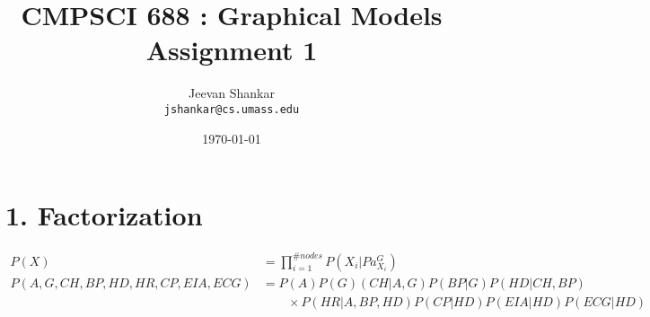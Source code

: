 \documentclass[a4paper,10pt]{report}
\title{CMPSCI 688 : Graphical Models \\ Assignment 1}
\author{\color{red}Jeevan Shankar \\ \texttt{jshankar@cs.umass.edu} }
\date{\today}
\begin{document}
\maketitle 
\section*{1. Factorization}
\begin{align*}
 P(X) &= \prod_{i=1}^{\# nodes} P(X_i | Pa_{X_i}^{G}) \\
 P(A, G, CH, BP, HD, HR, CP, EIA, ECG) &= P(A)P(G)(CH | A, G)P(BP | G)P(HD | CH, BP)
                              \nonumber \\ &\qquad{} \times P(HR | A,BP, HD) P(CP | HD)P(EIA|HD)P(ECG |HD) \\                                     
\end{align*}
\end{document}
